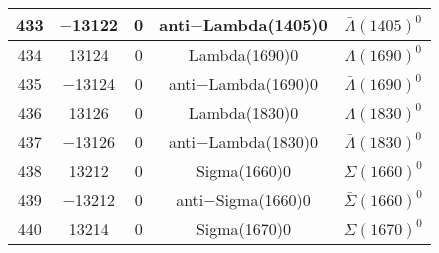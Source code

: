 \documentclass{article}
\begin{document}
\begin{table}[!htbp]
\begin{tabular}{|c|c|c|c|c|}
\hline
433 & $-$13122 & 0 & anti$-$Lambda(1405)0 & $\bar{\Lambda}(1405)^{0}$ \\
\hline
434 & 13124 & 0 & Lambda(1690)0 & $\Lambda(1690)^{0}$ \\
\hline
435 & $-$13124 & 0 & anti$-$Lambda(1690)0 & $\bar{\Lambda}(1690)^{0}$ \\
\hline
436 & 13126 & 0 & Lambda(1830)0 & $\Lambda(1830)^{0}$ \\
\hline
437 & $-$13126 & 0 & anti$-$Lambda(1830)0 & $\bar{\Lambda}(1830)^{0}$ \\
\hline
438 & 13212 & 0 & Sigma(1660)0 & $\Sigma(1660)^{0}$ \\
\hline
439 & $-$13212 & 0 & anti$-$Sigma(1660)0 & $\bar{\Sigma}(1660)^{0}$ \\
\hline
440 & 13214 & 0 & Sigma(1670)0 & $\Sigma(1670)^{0}$ \\
\hline
\end{tabular}
\end{table}

\clearpage
\end{document}

